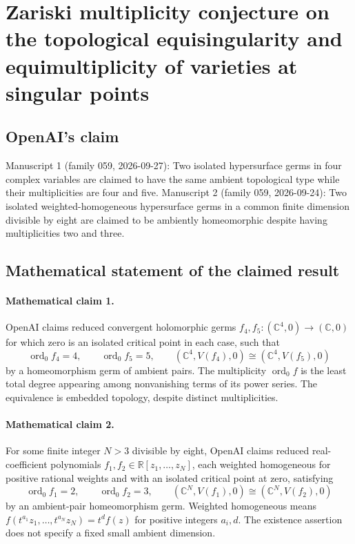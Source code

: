 \documentclass[11pt]{article}
\begin{document}
\section*{Zariski multiplicity conjecture on the topological equisingularity and equimultiplicity of varieties at singular points}

\subsection{OpenAI's claim}
Manuscript 1 (family 059, 2026-09-27): Two isolated hypersurface germs in four complex variables are claimed to have the same ambient topological type while their multiplicities are four and five. Manuscript 2 (family 059, 2026-09-24): Two isolated weighted-homogeneous hypersurface germs in a common finite dimension divisible by eight are claimed to be ambiently homeomorphic despite having multiplicities two and three.

\subsection{Mathematical statement of the claimed result}
\paragraph{Mathematical claim 1.} OpenAI claims reduced convergent holomorphic germs $f_4,f_5:(\mathbb C^4,0)\to(\mathbb C,0)$ for which zero is an isolated critical point in each case, such that
\[
\operatorname{ord}_0f_4=4,\qquad\operatorname{ord}_0f_5=5,\qquad
(\mathbb C^4,V(f_4),0)\cong(\mathbb C^4,V(f_5),0)
\]
by a homeomorphism germ of ambient pairs. The multiplicity $\operatorname{ord}_0f$ is the least total degree appearing among nonvanishing terms of its power series. The equivalence is embedded topology, despite distinct multiplicities.

\paragraph{Mathematical claim 2.} For some finite integer $N>3$ divisible by eight, OpenAI claims reduced real-coefficient polynomials $f_1,f_2\in\mathbb R[z_1,\ldots,z_N]$, each weighted homogeneous for positive rational weights and with an isolated critical point at zero, satisfying
\[
\operatorname{ord}_0f_1=2,\qquad\operatorname{ord}_0f_2=3,\qquad
(\mathbb C^N,V(f_1),0)\cong(\mathbb C^N,V(f_2),0)
\]
by an ambient-pair homeomorphism germ. Weighted homogeneous means $f(t^{a_1}z_1,\ldots,t^{a_N}z_N)=t^df(z)$ for positive integers $a_i,d$. The existence assertion does not specify a fixed small ambient dimension.
\end{document}
